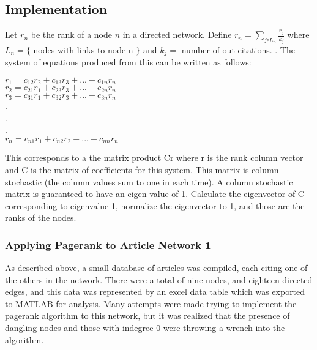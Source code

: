 \documentclass[12pt]{article} %
\begin{document}
  \subsection{Implementation}
  
  Let $r_{n}$ be the rank of a node $n$ in a directed network. Define $r_{n} = \displaystyle\sum\limits_{j\epsilon L_{n}} \frac{r_{j}}{k_{j}}$ where $L_{n} = \{$ nodes with links to node n $\}$ and $k_{j} =$ number of out citations. . The system of equations produced from this can be written as follows:\\
  \begin{center}
  $ r_{1} = c_{12} r_{2} + c_{13} r_{3} + . . . + c_{1n} r_{n}$ \\ 
  $ r_{2} = c_{21} r_{1} + c_{23} r_{3} + . . . + c_{2n} r_{n}$ \\
  $ r_{3} = c_{31} r_{1} + c_{32} r_{3} + . . . + c_{3n} r_{n}$ \\
  .\\
  .\\
  .\\
  $ r_{n} = c_{n1} r_{1} + c_{n2} r_{2} + . . . + c_{nn} r_{n}$\\
  \end{center}
  
  This corresponds to a the matrix product Cr where r is the rank column vector and C is the matrix of coefficients for this system. This matrix is column stochastic (the column values sum to one in each time). A column stochastic matrix is guaranteed to have an eigen value of 1. Calculate the eigenvector of C corresponding to eigenvalue 1, normalize the eigenvector to 1, and those are the ranks of the nodes.
  
    \subsubsection{Applying Pagerank to Article Network 1}
    \indent As described above, a small database of articles was compiled, each citing one of the others in the network. There were a total of nine nodes, and eighteen directed edges, and this data was represented by an excel data table which was exported to MATLAB for analysis. Many attempts were made trying to implement the pagerank algorithm to this network, but it was realized that the presence of dangling nodes and those with indegree 0 were throwing a wrench into the algorithm. 
\end{document}
